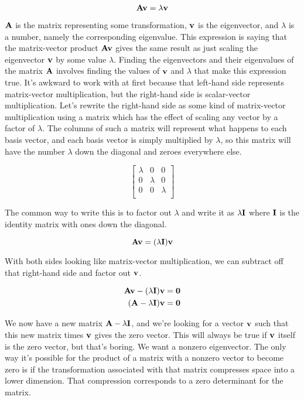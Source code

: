 \begin{equation*}
  \mathbf{A}\mathbf{v} = \lambda \mathbf{v}
\end{equation*}

$\mathbf{A}$ is the matrix representing some transformation, $\mathbf{v}$ is the
eigenvector, and $\lambda$ is a number, namely the corresponding eigenvalue.
This expression is saying that the matrix-vector product $\mathbf{A}\mathbf{v}$ gives
the same result as just scaling the eigenvector $\mathbf{v}$ by some value
$\lambda$. Finding the eigenvectors and their eigenvalues of the matrix
$\mathbf{A}$ involves finding the values of $\mathbf{v}$ and $\lambda$ that make this
expression true. It's awkward to work with at first because that left-hand side
represents matrix-vector multiplication, but the right-hand side is
scalar-vector multiplication. Let's rewrite the right-hand side as some kind of
matrix-vector multiplication using a matrix which has the effect of scaling any
vector by a factor of $\lambda$. The columns of such a matrix will represent
what happens to each basis vector, and each basis vector is simply multiplied by
$\lambda$, so this matrix will have the number $\lambda$ down the diagonal and
zeroes everywhere else.

\begin{equation*}
  \begin{bmatrix}
    \lambda & 0 & 0 \\
    0 & \lambda & 0 \\
    0 & 0 & \lambda \\
  \end{bmatrix}
\end{equation*}

The common way to write this is to factor out $\lambda$ and write it as
$\lambda\mathbf{I}$ where $\mathbf{I}$ is the identity matrix with ones down the
diagonal.

\begin{equation*}
  \mathbf{A}\mathbf{v} = (\lambda\mathbf{I}) \mathbf{v}
\end{equation*}

With both sides looking like matrix-vector multiplication, we can subtract off
that right-hand side and factor out $\mathbf{v}$.

\begin{align*}
  \mathbf{A}\mathbf{v} - (\lambda\mathbf{I}) \mathbf{v} &= \mathbf{0} \\
  (\mathbf{A} - \lambda\mathbf{I})\mathbf{v} &= \mathbf{0}
\end{align*}

We now have a new matrix $\mathbf{A} - \lambda\mathbf{I}$, and we're looking for a
vector $\mathbf{v}$ such that this new matrix times $\mathbf{v}$ gives the zero
vector. This will always be true if $\mathbf{v}$ itself is the zero vector, but
that's boring. We want a nonzero eigenvector. The only way it's possible for the
product of a matrix with a nonzero vector to become zero is if the
transformation associated with that matrix compresses space into a lower
dimension. That compression corresponds to a zero determinant for the matrix.


